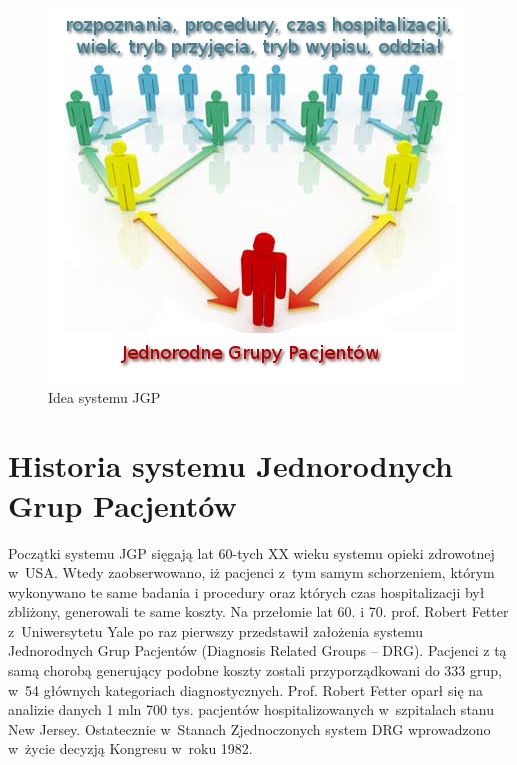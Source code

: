 \vspace*{1cm}
\begin{figure}[!ht]
\label{img:rysunek_jgp}
\includegraphics{images/standarization}
\caption[Rysunek przedstawiający ideę systemu JGP]{Idea systemu JGP}
\end{figure}


\section{Historia systemu Jednorodnych Grup Pacjentów}
\label{sec:historiaJGP}

Początki systemu JGP sięgają lat 60-tych XX wieku systemu opieki zdrowotnej w~USA. Wtedy zaobserwowano, iż pacjenci z~tym samym schorzeniem, którym wykonywano te same badania i procedury oraz których czas hospitalizacji był zbliżony, generowali te same koszty. Na przełomie lat 60. i 70. prof. Robert Fetter z~Uniwersytetu Yale po raz pierwszy przedstawił założenia systemu Jednorodnych Grup Pacjentów (Diagnosis Related Groups – DRG). Pacjenci z tą samą chorobą generujący podobne koszty zostali przyporządkowani do 333 grup, w~54 głównych kategoriach diagnostycznych. Prof. Robert Fetter oparł się na analizie danych 1 mln 700 tys. pacjentów hospitalizowanych w~szpitalach stanu New Jersey. Ostatecznie w~Stanach Zjednoczonych system DRG wprowadzono w~życie decyzją Kongresu w~roku 1982.

